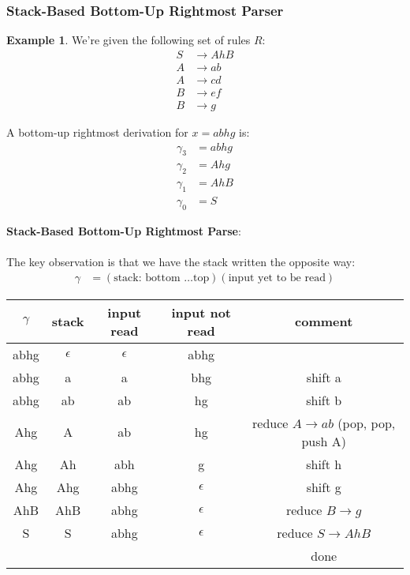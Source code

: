 \documentclass[]{article}
\theoremstyle{definition}
\newtheorem{ex}{Example}[section]
\newcommand{\lecture}[1]{\marginpar{{\footnotesize $\leftarrow$ \underline{#1}}}}
\begin{document}
			\subsubsection{Stack-Based Bottom-Up Rightmost Parser} \lecture{March 6, 2013}
				\begin{ex}
					We're given the following set of rules $R$:
					\begin{align*}
						S &\to AhB \\
						A &\to ab \\
						A &\to cd \\
						B &\to ef \\
						B &\to g
					\end{align*}

					A bottom-up rightmost derivation for $x = abhg$ is:
					\begin{align*}
						\gamma_3 &= abhg \\
						\gamma_2 &= Ahg \\
						\gamma_1 &= AhB \\
						\gamma_0 &= S
					\end{align*}
					
					\textbf{Stack-Based Bottom-Up Rightmost Parse}:
					\\ \\
					The key observation is that we have the stack written the opposite way:
					\begin{align*}
						\gamma &= (\text{stack: bottom \ldots top})(\text{input yet to be read})
					\end{align*}

					\begin{tabular}{|c|c|c|c|c|}
						\hline
						$\gamma$ & stack & input read & input not read & comment \\ \hline
						abhg & $\epsilon$ & $\epsilon$ & abhg & \\
						abhg & a & a & bhg & shift a \\
						abhg & ab & ab & hg & shift b \\
						Ahg & A & ab & hg & reduce $A \to ab$ (pop, pop, push A) \\
						Ahg & Ah & abh & g & shift h \\
						Ahg & Ahg & abhg & $\epsilon$ & shift g \\
						AhB & AhB & abhg & $\epsilon$ & reduce $B \to g$ \\
						S & S & abhg & $\epsilon$ & reduce $S \to AhB$ \\
						& & & & done \\ \hline
					\end{tabular}
				\end{ex}
\end{document}

